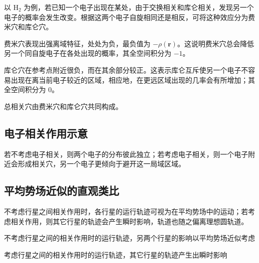 以 $\mathrm{H_2}$ 为例，若已知一个电子出现在某处，由于交换相关和库仑相关，发现另一个电子的概率会发生改变。根据这两个电子自旋相同还是相反，可将这种效应分为费米穴和库仑穴。

费米穴表现出强离域特征，处处为负，最负值为 $-\rho(\mathbf r)$。这说明费米穴总会降低另一个同自旋电子在各处出现的概率，其全空间积分为 $-1$。

库仑穴在参考点附近很负，而在其余部分较正。这表示库仑互斥使另一个电子不容易出现在离当前电子较近的区域，相应地，在更远区域出现的几率会有所增加；其全空间积分为 $0$。

总相关穴由费米穴和库仑穴共同构成。

\subsection*{电子相关作用示意}

若不考虑电子相关，则两个电子的分布彼此独立；若考虑电子相关，则一个电子附近会形成相关穴，另一个电子更倾向于避开这一局域区域。

\subsection*{平均势场近似的直观类比}

不考虑行星之间相关作用时，各行星的运行轨迹可视为在平均势场中的运动；若考虑相关作用，则其它行星的轨迹会产生瞬时影响，轨道也随之偏离理想圆轨道。

\begin{center}
\begin{minipage}{0.46\textwidth}
\centering
{}

不考虑行星之间的相关作用时的运行轨迹，另两个行星的影响以平均势场近似考虑
\end{minipage}
\hfill
\begin{minipage}{0.46\textwidth}
\centering
{}

考虑行星之间的相关作用时的运行轨迹，其它行星的轨迹产生出瞬时影响
\end{minipage}
\end{center}

